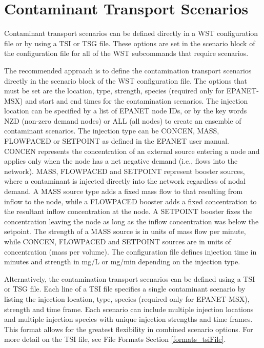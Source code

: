 \section{Contaminant Transport Scenarios}\label{sec:scenarios}
Contaminant transport scenarios can be defined directly in a WST configuration file
or by using a TSI or TSG file. These options are set in the scenario
block of the configuration file for all of the WST subcommands that require scenarios.

The recommended approach is to define the contamination transport scenarios directly in 
the scenario block of the WST configuration file. The options that must be set are 
the location, type, strength, species (required only for EPANET-MSX) 
and start and end times for the contamination scenarios. 
The injection location can be specified by a list of EPANET node IDs, 
or by the key words NZD (non-zero demand nodes) or ALL (all nodes) to create an ensemble of contaminant scenarios. 
The injection type can be CONCEN, MASS, FLOWPACED or SETPOINT as defined in the EPANET user manual\citep{EPANETusermanual}.  
CONCEN represents the concentration of an external source entering a node and 
applies only when the node has a net negative demand (i.e., flows into the network). 
MASS, FLOWPACED and SETPOINT represent booster sources, 
where a contaminant is injected directly into the network regardless of nodal demand.
A MASS source type adds a fixed mass flow to that resulting from inflow to the node, while 
a FLOWPACED booster adds a fixed concentration to the resultant inflow concentration at the node.
A SETPOINT booster fixes the concentration leaving the node as long as the 
inflow concentration was below the setpoint.
The strength of a MASS source is in units of mass flow per minute, while
CONCEN, FLOWPACED and SETPOINT sources are in units of concentration (mass per volume). 
The configuration file defines injection time in minutes and strength in mg/L or mg/min 
depending on the injection type.

Alternatively, the contamination transport scenarios can be defined using a TSI or TSG file. 
Each line of a TSI file specifies a single contaminant scenario by listing the 
injection location, type, species (required only for EPANET-MSX), strength and time frame. Each scenario can include 
multiple injection locations and multiple injection species with unique injection strengths and
time frames. This format allows for the greatest flexibility in combined scenario options.  
For more detail on the TSI file, see File Formats Section \ref{formats_tsiFile}.

